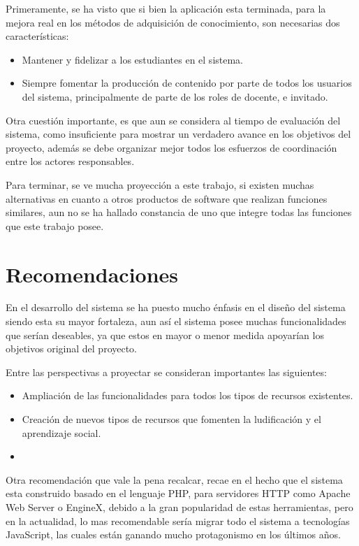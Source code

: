 Primeramente, se ha visto que si bien la aplicación esta terminada, para la
mejora real en los métodos de adquisición de conocimiento, son necesarias dos
características:

\begin{itemize}
\item Mantener y fidelizar a los estudiantes en el sistema.
\item Siempre fomentar la producción de contenido por parte de todos los
usuarios del sistema, principalmente de parte de los roles de docente, e
invitado.
\end{itemize}

Otra cuestión importante, es que aun se considera al tiempo de evaluación del
sistema, como insuficiente para mostrar un verdadero avance en los objetivos del
proyecto, además se debe organizar mejor todos los esfuerzos de coordinación
entre los actores responsables.

Para terminar, se ve mucha proyección a este trabajo, si existen muchas
alternativas en cuanto a otros productos de software que realizan funciones
similares, aun no se ha hallado constancia de uno que integre todas las
funciones que este trabajo posee.

\section{Recomendaciones}
En el desarrollo del sistema se ha puesto mucho énfasis en el diseño del sistema
siendo esta su mayor fortaleza, aun así el sistema posee muchas funcionalidades
que serían deseables, ya que estos en mayor o menor medida apoyarían los
objetivos original del proyecto.

Entre las perspectivas a proyectar se consideran importantes las siguientes:

\begin{itemize}
\item Ampliación de las funcionalidades para todos los tipos de recursos
existentes.
\item Creación de nuevos tipos de recursos que fomenten la ludificación y el
aprendizaje social.
\item 
\end{itemize}

Otra recomendación que vale la pena recalcar, recae en el hecho que el sistema
esta construido basado en el lenguaje PHP, para servidores HTTP como Apache Web
Server o EngineX, debido a la gran popularidad de estas herramientas, pero en la
actualidad, lo mas recomendable sería migrar todo el sistema a tecnologías
JavaScript, las cuales están ganando mucho protagonismo en los últimos años.

